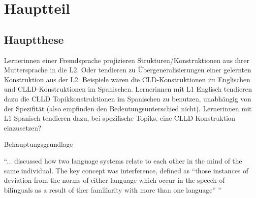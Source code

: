 \section{Hauptteil}

\subsection{Hauptthese}

Lernerinnen einer Fremdsprache projizieren Strukturen/Konstruktionen aus ihrer Muttersprache in die L2.
Oder tendieren zu Übergeneralisierungen einer gelernten Konstruktion aus der L2.
Beispiele wären die CLD-Konstruktionen im Englischen und CLLD-Konstruktionen im Spanischen.
Lernerinnen mit L1 Englisch tendieren dazu die CLLD Topikkonstruktionen im Spanischen zu benutzen, unabhängig von der Spezifität (also empfinden den Bedeutungsunterschied nicht).
Lernerinnen mit L1 Spanisch tendieren dazu, bei spezifische Topiks, eine CLLD Konstruktion einzusetzen?
\cite{Valenzuela05}


Behauptungsgrundlage

\cite{Weinreich79} ``... discussed how two language systems relate to each other in the mind of the same individual.
The key concept was interference, defined as ``those instances of deviation from the norms of either language which occur in the speech of bilinguals as a result of ther familiarity with more than one language'' \cite{Weinreich79} '' \cite{Cook93}

